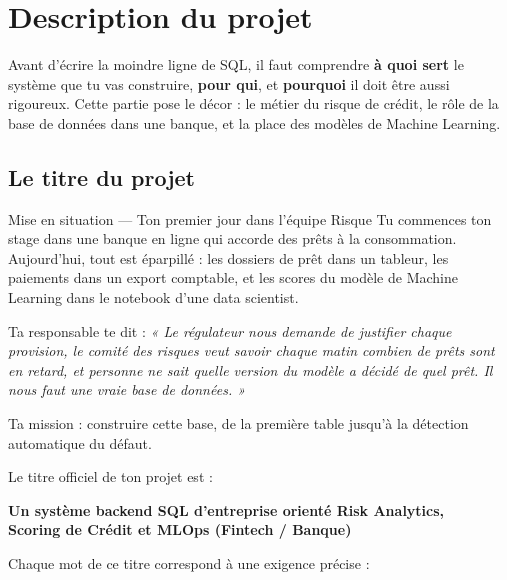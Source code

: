 \chapter{Description du projet}


Avant d'écrire la moindre ligne de SQL, il faut comprendre \textbf{à quoi sert} le système que tu vas
construire, \textbf{pour qui}, et \textbf{pourquoi} il doit être aussi rigoureux. Cette partie pose le
décor : le métier du risque de crédit, le rôle de la base de données dans une banque, et la place
des modèles de Machine Learning.

\section{Le titre du projet}

\begin{situation}{Mise en situation --- Ton premier jour dans l'équipe Risque}
Tu commences ton stage dans une banque en ligne qui accorde des prêts à la consommation. Aujourd'hui,
tout est éparpillé : les dossiers de prêt dans un tableur, les paiements dans un export comptable, et
les scores du modèle de Machine Learning dans le notebook d'une data scientist.

Ta responsable te dit : \emph{« Le régulateur nous demande de justifier chaque provision, le comité
des risques veut savoir chaque matin combien de prêts sont en retard, et personne ne sait quelle
version du modèle a décidé de quel prêt. Il nous faut une vraie base de données. »}

Ta mission : construire cette base, de la première table jusqu'à la détection automatique du défaut.
\end{situation}

Le titre officiel de ton projet est :
\begin{center}
\textbf{\large Un système backend SQL d'entreprise orienté Risk Analytics,\\Scoring de Crédit et MLOps
(Fintech / Banque)}
\end{center}

Chaque mot de ce titre correspond à une exigence précise :

